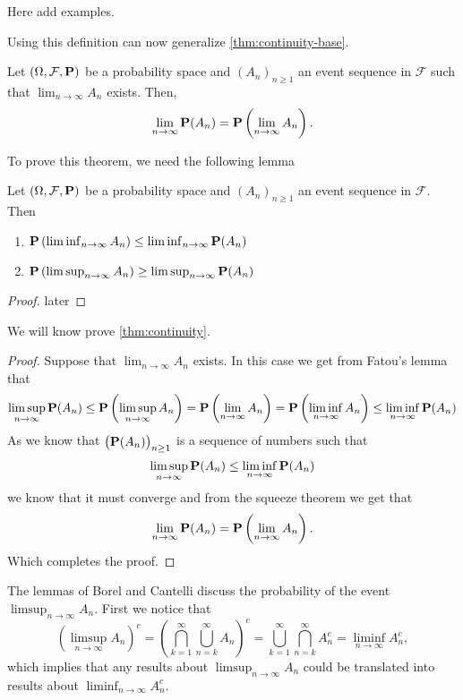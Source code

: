 \documentclass[11pt,a4paper]{article}
\begin{document}
  Here add examples.

  Using this definition can now generalize \autoref{thm:continuity-base}.
  \begin{theorem}
  \label{thm:continuity}
    Let $(\Omega, \mathcal F, \mathbf{P})$ be a probability space and
    $(A_n)_{n \geq 1}$ an event sequence in $\mathcal F$ such that
    $\lim_{n \to \infty} A_n$ exists. Then,
    \[
      \lim_{n \to \infty} \mathbf{P}(A_n) =
      \mathbf{P}\left(\lim_{n \to \infty} A_n\right).
    \]
  \end{theorem}
  
  To prove this theorem, we need the following lemma
  \begin{lemma}\label{lem:fatou}
    Let $(\Omega, \mathcal F, \mathbf{P})$ be a probability space and
    $(A_n)_{n \geq 1}$ an event sequence in $\mathcal F$. Then
    \begin{enumerate}
      \item $\mathbf{P}\left(\liminf_{n \to \infty} A_n\right) \le
            \liminf_{n \to \infty} \mathbf{P}(A_n)$
      \item $\mathbf{P}\left(\limsup_{n \to \infty} A_n\right) \geq
            \limsup_{n \to \infty} \mathbf{P}(A_n)$
    \end{enumerate}
  \end{lemma}
  \begin{proof}
    later
  \end{proof}
  We will know prove \autoref{thm:continuity}.
  \begin{proof}
    Suppose that $\lim_{n \to \infty} A_n$ exists.
    In this case we get from Fatou's lemma that
    \[
      \limsup_{n \to \infty} \mathbf{P}(A_n) \le
      \mathbf{P}\left(\limsup_{n \to \infty} A_n\right) =
      \mathbf{P}\left(\lim_{n \to \infty} A_n\right) =
      \mathbf{P}\left(\liminf_{n \to \infty} A_n\right) \le
      \liminf_{n \to \infty} \mathbf{P}(A_n)
    \]
    As we know that $\left(\mathbf{P}(A_n)\right)_{n \geq 1}$ is a sequence of
    numbers such that
    \[
      \limsup_{n \to \infty} \mathbf{P}(A_n) \le \liminf_{n \to \infty} \mathbf{P}(A_n)
    \]
    we know that it must converge and from the squeeze theorem we get that
    \[
      \lim_{n \to \infty} \mathbf{P}(A_n) =
      \mathbf{P}\left(\lim_{n \to \infty} A_n\right).
    \]
    Which completes the proof.
  \end{proof}

  The lemmas of Borel and Cantelli discuss the probability of the
  event $\limsup_{n \to \infty} A_n$. First we notice that
  \[
    \left( \limsup_{n \to \infty} A_n \right)^c =
    \left(\bigcap_{k=1}^{\infty} \bigcup_{n=k}^{\infty} A_n\right)^c =
    \bigcup_{k=1}^{\infty} \bigcap_{n=k}^{\infty} A_n^c =
    \liminf_{n \to \infty} A_n^c,
  \]
  which implies that any results about $\limsup_{n \to \infty} A_n$ could
  be translated into results about $\liminf_{n \to \infty} A_n^c$.
\end{document}
